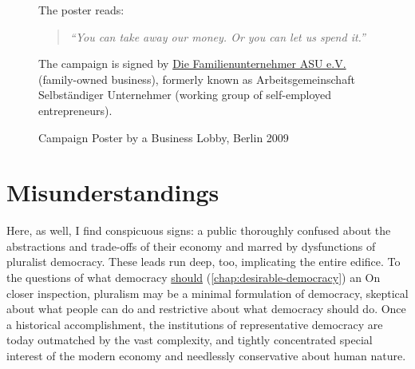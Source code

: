 
\begin{figure}[htbp]
	\centering
	\caption[Entrepreneurship Campaign Poster]{Campaign Poster by a Business Lobby, Berlin 2009}
	\begin{flushleft}
		\scriptsize{The poster reads:
			\begin{quote}
				\emph{``You can take away our money.
				Or you can let us spend it.''}
			\end{quote}
			The campaign is signed by \href{http://www.familienunternehmer.eu}{Die Familienunternehmer ASU e.V.} (family-owned business), formerly known as Arbeitsgemeinschaft Selbst\"{a}ndiger Unternehmer (working group of self-employed entrepreneurs).}
	\end{flushleft}
	\label{fig:asu-poster}
\end{figure}



\section{Misunderstandings}

Here, as well, I find conspicuous signs:
a public thoroughly confused about the abstractions and trade-offs of their economy and marred by dysfunctions of pluralist democracy.
These leads run deep, too, implicating the entire edifice.
To the questions of what democracy \hyperref[chap:desirable-democracy]{should} (\autoref{chap:desirable-democracy}) an On closer inspection, pluralism may be a minimal formulation of democracy, skeptical about what people can do and restrictive about what democracy should do.
Once a historical accomplishment, the institutions of representative democracy are today outmatched by the vast complexity, and tightly concentrated special interest of the modern economy and needlessly conservative about human nature.


